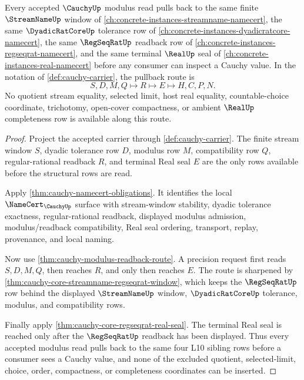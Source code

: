 \begin{theorem}
\label{thm:cauchy-finite-window-modulus-pullback}
Every accepted $\CauchyUp$ modulus read pulls back to the same finite $\StreamNameUp$ window of \autoref{ch:concrete-instances-streamname-namecert}, the same $\DyadicRatCoreUp$ tolerance row of \autoref{ch:concrete-instances-dyadicratcore-namecert}, the same $\RegSeqRatUp$ readback row of \autoref{ch:concrete-instances-regseqrat-namecert}, and the same terminal $\RealUp$ seal of \autoref{ch:concrete-instances-real-namecert} before any consumer can inspect a Cauchy value. In the notation of \autoref{def:cauchy-carrier}, the pullback route is
$$
S,D,M,Q \longmapsto R \longmapsto E \longmapsto H,C,P,N .
$$
No quotient stream equality, selected limit, host real equality, countable-choice coordinate, trichotomy, open-cover compactness, or ambient $\RealUp$ completeness row is available along this route.
\end{theorem}
\begin{proof}
Project the accepted carrier through \autoref{def:cauchy-carrier}. The finite stream window $S$, dyadic tolerance row $D$, modulus row $M$, compatibility row $Q$, regular-rational readback $R$, and terminal Real seal $E$ are the only rows available before the structural rows are read.

Apply \autoref{thm:cauchy-namecert-obligations}. It identifies the local $\NameCert_{\CauchyUp}$ surface with stream-window stability, dyadic tolerance exactness, regular-rational readback, displayed modulus admission, modulus/readback compatibility, Real seal ordering, transport, replay, provenance, and local naming.

Now use \autoref{thm:cauchy-modulus-readback-route}. A precision request first reads $S,D,M,Q$, then reaches $R$, and only then reaches $E$. The route is sharpened by \autoref{thm:cauchy-core-streamname-regseqrat-window}, which keeps the $\RegSeqRatUp$ row behind the displayed $\StreamNameUp$ window, $\DyadicRatCoreUp$ tolerance, modulus, and compatibility rows.

Finally apply \autoref{thm:cauchy-core-regseqrat-real-seal}. The terminal Real seal is reached only after the $\RegSeqRatUp$ readback has been displayed. Thus every accepted modulus read pulls back to the same four L10 sibling rows before a consumer sees a Cauchy value, and none of the excluded quotient, selected-limit, choice, order, compactness, or completeness coordinates can be inserted.
\end{proof}


